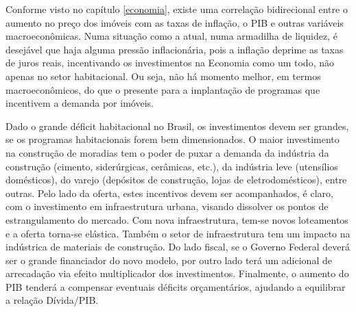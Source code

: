 \documentclass[
	12pt,				%
	oneside,			%
	a4paper,			%
	chapter=TITLE,		%
	section=TITLE,		%
	english,			%
	brazil				%
	]{abntex2}
\begin{document}
\begin{refsection}
Conforme visto no capítulo \ref{economia}, existe uma correlação bidirecional
entre o aumento no preço dos imóveis com as taxas de inflação, o \gls{PIB} e
outras variáveis macroeconômicas. Numa situação como a atual, numa armadilha de
liquidez, é desejável que haja alguma pressão inflacionária, pois a inflação
deprime as taxas de juros reais, incentivando os investimentos na Economia como
um todo, não apenas no setor habitacional. Ou seja, não há momento melhor, em
termos macroeconômicos, do que o presente para a implantação de programas que
incentivem a demanda por imóveis.

Dado o grande déficit habitacional no Brasil, os investimentos devem ser
grandes, se os programas habitacionais forem bem dimensionados. O maior
investimento na construção de moradias tem o poder de puxar a demanda da
indústria da construção (cimento, siderúrgicas, cerâmicas, etc.), da indústria
leve (utensílios domésticos), do varejo (depósitos de construção, lojas de
eletrodomésticos), entre outras. Pelo lado da oferta, estes incentivos devem ser
acompanhados, é claro, com o investimento em infraestrutura urbana, visando
dissolver os pontos de estrangulamento do mercado. Com nova infraestrutura,
tem-se novos loteamentos e a oferta torna-se elástica. Também o setor de
infraestrutura tem um impacto na indústrica de materiais de construção. Do lado
fiscal, se o Governo Federal deverá ser o grande financiador do novo modelo, por
outro lado terá um adicional de arrecadação via efeito multiplicador dos
investimentos. Finalmente, o aumento do \gls{PIB} tenderá a compensar eventuais
déficits orçamentários, ajudando a equilibrar a relação Dívida/\gls{PIB}.


\end{refsection}
\end{document}

